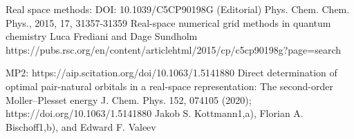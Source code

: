 \documentclass{article}
\begin{document}
Real space methods:
 DOI: 10.1039/C5CP90198G (Editorial) Phys. Chem. Chem. Phys., 2015, 17, 31357-31359
Real-space numerical grid methods in quantum chemistry
Luca Frediani and Dage Sundholm
https://pubs.rsc.org/en/content/articlehtml/2015/cp/c5cp90198g?page=search



MP2:
https://aip.scitation.org/doi/10.1063/1.5141880
Direct determination of optimal pair-natural orbitals in a real-space representation: The second-order Moller–Plesset energy
 J. Chem. Phys. 152, 074105 (2020); https://doi.org/10.1063/1.5141880
Jakob S. Kottmann1,a), Florian A. Bischoff1,b), and Edward F. Valeev

\end{document}
